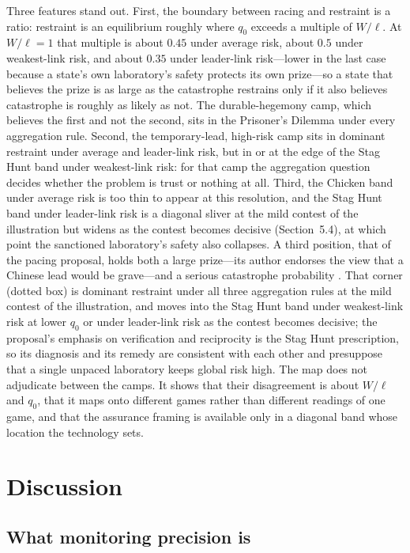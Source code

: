 \documentclass[11pt]{article}
\theoremstyle{plain}
\theoremstyle{definition}
\theoremstyle{remark}
\begin{document}
Three features stand out. First, the boundary between racing and restraint is a ratio: restraint is an equilibrium roughly where $q_0$ exceeds a multiple of $W/\ell$. At $W/\ell=1$ that multiple is about $0.45$ under average risk, about $0.5$ under weakest-link risk, and about $0.35$ under leader-link risk---lower in the last case because a state's own laboratory's safety protects its own prize---so a state that believes the prize is as large as the catastrophe restrains only if it also believes catastrophe is roughly as likely as not. The durable-hegemony camp, which believes the first and not the second, sits in the Prisoner's Dilemma under every aggregation rule. Second, the temporary-lead, high-risk camp sits in dominant restraint under average and leader-link risk, but in or at the edge of the Stag Hunt band under weakest-link risk: for that camp the aggregation question decides whether the problem is trust or nothing at all. Third, the Chicken band under average risk is too thin to appear at this resolution, and the Stag Hunt band under leader-link risk is a diagonal sliver at the mild contest of the illustration but widens as the contest becomes decisive (Section~5.4), at which point the sanctioned laboratory's safety also collapses. A third position, that of the pacing proposal, holds both a large prize---its author endorses the view that a Chinese lead would be grave---and a serious catastrophe probability \citep{amodei2026}. That corner (dotted box) is dominant restraint under all three aggregation rules at the mild contest of the illustration, and moves into the Stag Hunt band under weakest-link risk at lower $q_0$ or under leader-link risk as the contest becomes decisive; the proposal's emphasis on verification and reciprocity is the Stag Hunt prescription, so its diagnosis and its remedy are consistent with each other and presuppose that a single unpaced laboratory keeps global risk high. The map does not adjudicate between the camps. It shows that their disagreement is about $W/\ell$ and $q_0$, that it maps onto different games rather than different readings of one game, and that the assurance framing is available only in a diagonal band whose location the technology sets.

\section{Discussion}

\subsection{What monitoring precision is}
\end{document}
